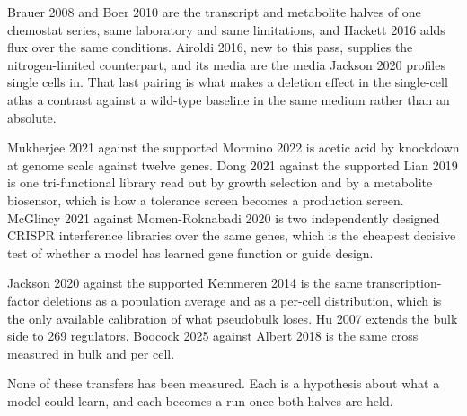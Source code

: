  Brauer 2008 and Boer 2010 are
the transcript and metabolite halves of one chemostat series, same laboratory and same
limitations, and Hackett 2016 adds flux over the same conditions. Airoldi 2016, new to this
pass, supplies the nitrogen-limited counterpart, and its media are the media Jackson 2020
profiles single cells in. That last pairing is what makes a deletion effect in the
single-cell atlas a contrast against a wild-type baseline in the same medium rather than an
absolute.

 Mukherjee 2021 against the supported
Mormino 2022 is acetic acid by knockdown at genome scale against twelve genes. Dong 2021
against the supported Lian 2019 is one tri-functional library read out by growth selection
and by a metabolite biosensor, which is how a tolerance screen becomes a production screen.
McGlincy 2021 against Momen-Roknabadi 2020 is two independently designed CRISPR
interference libraries over the same genes, which is the cheapest decisive test of whether
a model has learned gene function or guide design.

 Jackson 2020 against the
supported Kemmeren 2014 is the same transcription-factor deletions as a population average
and as a per-cell distribution, which is the only available calibration of what pseudobulk
loses. Hu 2007 extends the bulk side to 269 regulators. Boocock 2025 against Albert 2018 is
the same cross measured in bulk and per cell.

None of these transfers has been measured. Each is a hypothesis about what a model could
learn, and each becomes a run once both halves are held.

\clearpage

